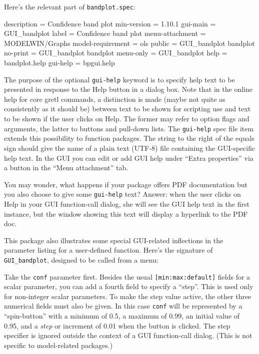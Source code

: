 \documentclass[oneside]{book}
\begin{document}
Here's the relevant part of \texttt{bandplot.spec}:

\begin{code}
description = Confidence band plot
min-version = 1.10.1
gui-main = GUI_bandplot
label = Confidence band plot
menu-attachment = MODELWIN/Graphs
model-requirement = ols
public = GUI_bandplot bandplot
no-print = GUI_bandplot bandplot
menu-only = GUI_bandplot
help = bandplot.help
gui-help = bpgui.help
\end{code}

The purpose of the optional \texttt{gui-help} keyword is to specify
help text to be presented in response to the \textsf{Help} button in a
dialog box. Note that in the online help for core gretl commands, a
distinction is made (maybe not quite as consistently as it should be)
between text to be shown for scripting use and text to be shown if the
user clicks on \textsf{Help}. The former may refer to option flags and
arguments, the latter to buttons and pull-down lists. The
\texttt{gui-help} spec file item extends this possibility to function
packages. The string to the right of the equals sign should give the
name of a plain text (UTF-8) file containing the GUI-specific help
text. In the GUI you can edit or add GUI help under ``Extra
properties'' via a button in the ``Menu attachment'' tab.

You may wonder, what happens if your package offers PDF documentation
but you also choose to give some \texttt{gui-help} text? Answer: when
the user clicks on \textsf{Help} in your GUI function-call dialog, she
will see the GUI help text in the first instance, but the window
showing this text will display a hyperlink to the PDF doc.

This package also illustrates some special GUI-related inflections in
the parameter listing for a user-defined function. Here's the
signature of \texttt{GUI\_bandplot}, designed to be called from a
menu:
%
Take the \texttt{conf} parameter first. Besides the usual
\texttt{[min:max:default]} fields for a scalar parameter, you can add
a fourth field to specify a ``step''. This is used only for
non-integer scalar parameters. To make the step value active, the
other three numerical fields must also be given.  In this case
\texttt{conf} will be represented by a ``spin-button'' with a minimum
of 0.5, a maximum of 0.99, an initial value of 0.95, and a
\textit{step} or increment of 0.01 when the button is clicked. The
step specifier is ignored outside the context of a GUI function-call
dialog. (This is not specific to model-related packages.)
\end{document}
